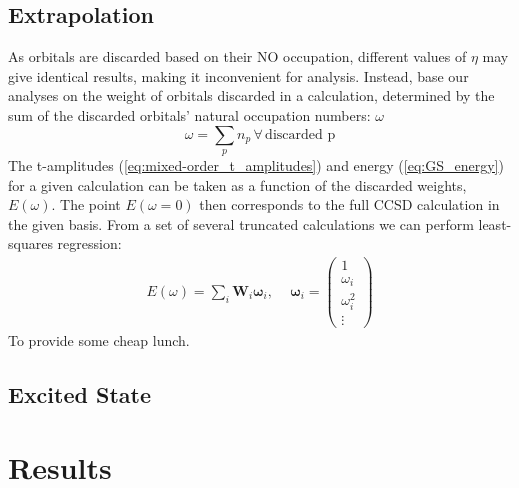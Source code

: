 \documentclass[letterpaper, 12pt]{article}
\begin{document}
\subsection{Extrapolation}
As orbitals are discarded based on their NO occupation, different values of $\eta$ may give identical results, making it inconvenient for analysis. Instead, base our analyses on the weight of orbitals discarded in a calculation, determined by the sum of the discarded orbitals' natural occupation numbers: $\omega$  
\begin{equation}
\omega = \sum_p n_p \, \forall \, \text{discarded p} 
\end{equation}
The t-amplitudes (\ref{eq:mixed-order_t_amplitudes}) and energy (\ref{eq:GS_energy}) for a given calculation can be taken as a function of the discarded weights, $E(\omega)$. The point $E(\omega = 0)$ then corresponds to the full CCSD calculation in the given basis. From a set of several truncated calculations we can perform least-squares regression:
\begin{align}
E(\omega) = \sum_i \mathbf{W}_i \mathbf{\omega}_i, \,\quad  \mathbf{\omega}_i = 
\begin{pmatrix} 1 \\ \omega_i \\ \omega_i^2 \\ \vdots
\end{pmatrix}
\end{align}
To provide some cheap lunch.
\subsection{Excited State}

\section{Results}
\end{document}
